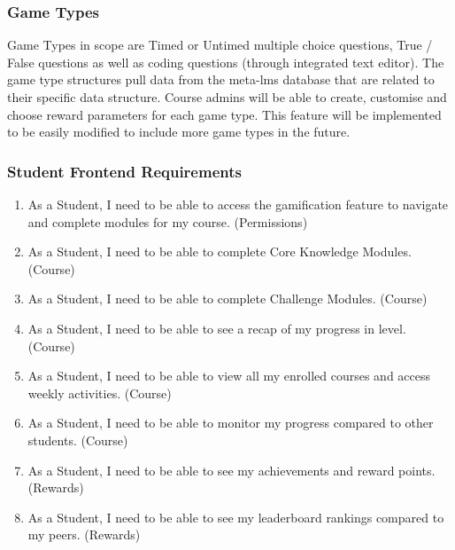 \subsubsection{Game Types}
Game Types in scope are Timed or Untimed multiple choice questions, True / False questions as well as coding questions (through integrated text editor). The game type structures pull data from the meta-lms database that are related to their specific data structure. Course admins will be able to create, customise and choose reward parameters for each game type. This feature will be implemented to be easily modified to include more game types in the future.

\subsubsection{Student Frontend Requirements}
\begin{enumerate}
    \item As a Student, I need to be able to access the gamification feature to navigate and complete modules for my course. (Permissions)
    \item As a Student, I need to be able to complete Core Knowledge Modules. (Course)
    \item As a Student, I need to be able to complete Challenge Modules. (Course)
    \item As a Student, I need to be able to see a recap of my progress in level. (Course)
    \item As a Student, I need to be able to view all my enrolled courses and access weekly activities. (Course)
    \item As a Student, I need to be able to monitor my progress compared to other students. (Course)
    \item As a Student, I need to be able to see my achievements and reward points. (Rewards)
    \item As a Student, I need to be able to see my leaderboard rankings compared to my peers. (Rewards)
\end{enumerate}

